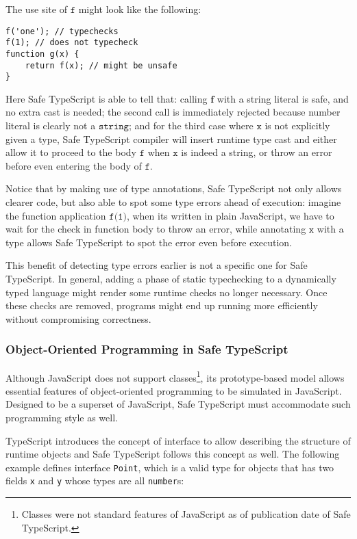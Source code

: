 The use site of $\texttt{f}$ might look like the following:

\begin{verbatim}
f('one'); // typechecks
f(1); // does not typecheck
function g(x) {
    return f(x); // might be unsafe
}
\end{verbatim}

Here Safe TypeScript is able to tell that:
calling $\textbf{f}$ with a string literal
is safe, and no extra cast is needed; the second call is immediately rejected
because number literal is clearly not a $\texttt{string}$;
and for the third case where $\texttt{x}$
is not explicitly given a type, Safe TypeScript compiler will insert runtime type cast
and either allow it to proceed to the body $\texttt{f}$ when $\texttt{x}$ is indeed a string,
or throw an error before even entering the body of $\texttt{f}$.

Notice that by making use of type annotations, Safe TypeScript not only allows
clearer code, but also able to spot some type errors ahead of execution:
imagine the function application $\texttt{f(1)}$, when its written in plain JavaScript,
we have to wait for the check in function body to throw an error,
while annotating $\texttt{x}$ with a type allows Safe TypeScript
to spot the error even before execution.

This benefit of detecting type errors earlier is not a specific one for Safe TypeScript.
In general, adding a phase of static typechecking to a dynamically typed language
might render some runtime checks no longer necessary.
Once these checks are removed,
programs might end up running more efficiently without compromising correctness.


\subsubsection{Object-Oriented Programming in Safe TypeScript}

Although JavaScript does not support classes\footnote{
	Classes were not standard features of JavaScript
	as of publication date of Safe TypeScript.
},
its prototype-based model allows essential features of object-oriented
programming to be simulated in JavaScript.
Designed to be a superset of JavaScript, Safe TypeScript must accommodate such programming
style as well.

TypeScript introduces the concept of interface to allow describing
the structure of runtime objects and Safe TypeScript follows this concept as well.
The following example defines
interface \texttt{Point}, which is a valid type for objects
that has two fields \texttt{x} and \texttt{y} whose types are all \texttt{number}s:

